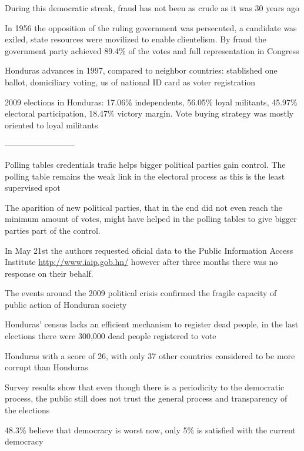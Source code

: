 \documentclass[a4paper,10pt]{article}
\begin{document}
During this democratic streak, fraud has not been as crude as it was 30 years ago \citep{romero2014}

In 1956 the opposition of the ruling government was persecuted, a candidate was exiled, state resources were movilized to enable clientelism. By fraud the government party achieved 89.4\% of the votes and full representation in Congress \citep{romero2014}

Honduras advances in 1997, compared to neighbor countries: stablished one ballot, domiciliary voting, us of national ID card as voter registration \citep{romero2014}

2009 elections in Honduras: 17.06\% independents, 56.05\% loyal militants, 45.97\% electoral participation, 18.47\% victory margin. Vote buying strategy was mostly oriented to loyal militants \citep{gonza2014}




--------------------------

Polling tables credentials trafic helps bigger political parties gain control. The polling table remains the weak link in the electoral process as this is the least supervised spot \citep{romero2014}

The aparition of new political parties, that in the end did not even reach the minimum amount of votes, might have helped in the polling tables to give bigger parties part of the control.

In May 21st the authors requested oficial data to the Public Information Access Institute \url{http://www.iaip.gob.hn/} however after three months there was no response on their behalf.

The events around the 2009 political crisis confirmed the fragile capacity of public action of Honduran society \citep{romero2014}

Honduras' census lacks an efficient mechanism to register dead people, in the last elections there were 300,000 dead people registered to vote \citep{romero2014}

Honduras with a score of 26, with only 37 other countries considered to be more corrupt than Honduras \citep{transp}

Survey results show that even though there is a periodicity to the democratic process, the public still does not trust the general process and transparency of the elections \citep{romero2014}

48.3\% believe that democracy is worst now, only 5\% is satisfied with the current democracy \citep{latinbar}
\end{document}
